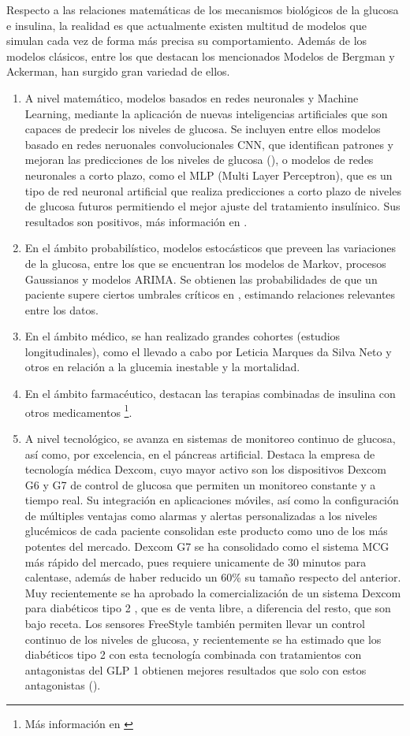 Respecto a las relaciones matemáticas de los mecanismos biológicos de la glucosa e insulina, la realidad es que actualmente existen multitud de modelos que simulan cada vez de forma más precisa su comportamiento. Además de los modelos clásicos, entre los que destacan los mencionados Modelos de Bergman y Ackerman, han surgido gran variedad de ellos.
\begin{enumerate}
    \item A nivel matemático, modelos basados en redes neuronales y Machine Learning, mediante la aplicación de nuevas inteligencias artificiales que son capaces de predecir los niveles de glucosa. Se incluyen entre ellos modelos basado en redes neruonales convolucionales CNN, que identifican patrones y mejoran las predicciones de los niveles de glucosa (\cite{carrillo2021long}), o 
    modelos de redes neuronales a corto plazo, como el 
    MLP (Multi Layer Perceptron), que es un tipo de red neuronal artificial que realiza predicciones a corto plazo de niveles de glucosa futuros permitiendo el mejor ajuste del tratamiento insulínico. Sus resultados son positivos, más información en \cite{allam2011recurrent}.
    \item En el ámbito probabilístico, modelos estocásticos que preveen las variaciones de la glucosa, entre los que se encuentran los modelos de Markov, procesos Gaussianos y modelos ARIMA. Se obtienen las probabilidades de que un paciente supere ciertos umbrales críticos en \cite{caperamodelo}, estimando relaciones relevantes entre los datos.
    \item En el ámbito médico, se han realizado grandes cohortes (estudios longitudinales), como el llevado a cabo por Leticia Marques da Silva Neto y otros \cite{da2024asociacion} en relación a la glucemia inestable y la mortalidad.
    \item En el ámbito farmacéutico, destacan las terapias combinadas de insulina con otros medicamentos \footnote{Más información en \cite{karam2024capitulo}}.
    \item A nivel tecnológico, se avanza en sistemas de monitoreo continuo de glucosa, así como, por excelencia, en el páncreas artificial. Destaca la empresa de tecnología médica Dexcom, cuyo mayor activo son los dispositivos Dexcom G6 y G7 de control de glucosa que permiten un monitoreo constante y a tiempo real. Su integración en aplicaciones móviles, así como la configuración de múltiples ventajas como alarmas y alertas personalizadas a los niveles glucémicos de cada paciente consolidan este producto como uno de los más potentes del mercado. Dexcom G7 se ha consolidado como el sistema MCG más rápido del mercado, pues requiere unicamente de 30 minutos para calentase, además de haber reducido un 60\% su tamaño respecto del anterior. Muy recientemente se ha aprobado la comercialización de un sistema Dexcom para diabéticos tipo 2 \cite{infobae_monitor_glucosa}, que es de venta libre, a diferencia del resto, que son bajo receta. Los sensores FreeStyle también permiten llevar un control continuo de los niveles de glucosa, y recientemente se ha estimado que los diabéticos tipo 2 con esta tecnología combinada con tratamientos con antagonistas del GLP 1 obtienen mejores resultados que solo con estos antagonistas (\cite{immedicohospitalario_freestyle}).

\end{enumerate}
